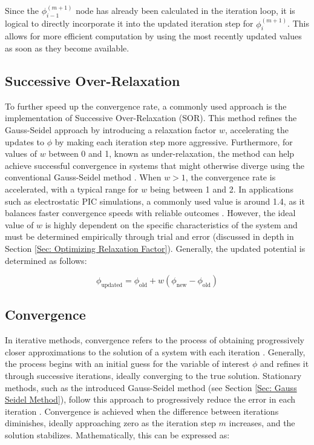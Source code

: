Since the $\phi_{i-1}^{(m+1)}$ node has already been calculated in the iteration loop, it is logical to directly incorporate it into the updated iteration step for $\phi_i^{(m+1)}$. This allows for more efficient computation by using the most recently updated values as soon as they become available.


\subsection{Successive Over-Relaxation}

To further speed up the convergence rate, a commonly used approach is the implementation of Successive Over-Relaxation (\acs{SOR}). This method refines the Gauss-Seidel approach by introducing a relaxation factor $w$, accelerating the updates to $\phi$ by making each iteration step more aggressive. Furthermore, for values of $w$ between 0 and 1, known as under-relaxation, the method can help achieve successful convergence in systems that might otherwise diverge using the conventional Gauss-Seidel method \cite{allahviranloo_successive_2005}. When $w > 1$, the convergence rate is accelerated, with a typical range for $w$ being between 1 and 2. In applications such as electrostatic \acs{PIC} simulations, a commonly used value is around 1.4, as it balances faster convergence speeds with reliable outcomes \cite{brieda_plasma_2019}. However, the ideal value of $w$ is highly dependent on the specific characteristics of the system and must be determined empirically through trial and error (discussed in depth in Section \ref{Sec: Optimizing Relaxation Factor}). Generally, the updated potential is determined as follows:

\begin{equation}
\phi_\mathrm{updated} = \phi_\mathrm{old} + w (\phi_\mathrm{new} - \phi_\mathrm{old})
\end{equation}


\subsection{Convergence}\label{Sec: Convergence}

In iterative methods, convergence refers to the process of obtaining progressively closer approximations to the solution of a system with each iteration \cite{barrett_templates_1994}. Generally, the process begins with an initial guess for the variable of interest $\phi$ and refines it through successive iterations, ideally converging to the true solution. Stationary methods, such as the introduced Gauss-Seidel method (see Section \ref{Sec: Gauss Seidel Method}), follow this approach to progressively reduce the error in each iteration \cite{barrett_templates_1994}. Convergence is achieved when the difference between iterations diminishes, ideally approaching zero as the iteration step $m$ increases, and the solution stabilizes. Mathematically, this can be expressed as:

